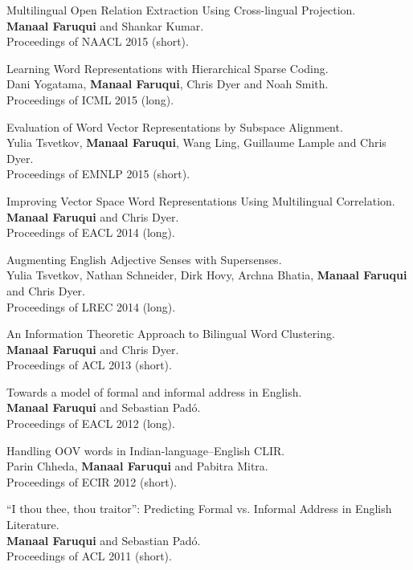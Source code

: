 \documentclass[margin,line]{res}
\begin{document}
\begin{resume}
Multilingual Open Relation Extraction Using Cross-lingual Projection.\\
\textbf{Manaal Faruqui} and Shankar Kumar.\\
Proceedings of NAACL 2015 (short).

\pagebreak

Learning Word Representations with Hierarchical Sparse Coding.\\
Dani Yogatama, \textbf{Manaal Faruqui}, Chris Dyer and Noah Smith.\\
Proceedings of ICML 2015 (long).

Evaluation of Word Vector Representations by Subspace Alignment.\\
Yulia Tsvetkov, \textbf{Manaal Faruqui}, Wang Ling, Guillaume Lample and Chris Dyer.\\
Proceedings of EMNLP 2015 (short).

Improving Vector Space Word Representations Using Multilingual Correlation.\\
\textbf{Manaal Faruqui} and Chris Dyer.\\
Proceedings of EACL 2014 (long).

Augmenting English Adjective Senses with Supersenses.\\
Yulia Tsvetkov, Nathan Schneider, Dirk Hovy, Archna Bhatia, \textbf{Manaal Faruqui} and Chris Dyer.\\
Proceedings of LREC 2014 (long).

An Information Theoretic Approach to Bilingual Word Clustering.\\
\textbf{Manaal Faruqui} and Chris Dyer.\\
Proceedings of ACL 2013 (short).

Towards a model of formal and informal address in English.\\
\textbf{Manaal Faruqui} and Sebastian Pad\'{o}.\\
Proceedings of EACL 2012 (long).

Handling OOV words in Indian-language--English CLIR.\\
Parin Chheda, \textbf{Manaal Faruqui} and Pabitra Mitra.\\
Proceedings of ECIR 2012 (short).

``I thou thee, thou traitor'': Predicting Formal vs. Informal Address in English Literature.\\
\textbf{Manaal Faruqui} and Sebastian Pad\'{o}.\\
Proceedings of ACL 2011 (short).


\end{resume}
\end{document}
